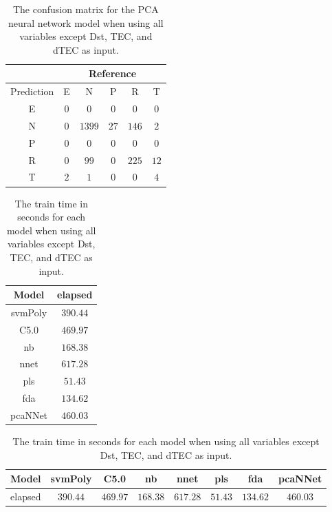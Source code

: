 \begin{table}[!ht]
	\centering
	\begin{tabular}{|c|c|c|c|c|c|}
		\hline
		 & \multicolumn{5}{|c|}{Reference} \\ \hline
		 Prediction & E & N & P & R & T \\ \hline
		 E & $0$ & $0$ & $0$ & $0$ & $0$ \\ \hline
		 N & $0$ & $1399$ & $27$ & $146$ & $2$ \\ \hline
		 P & $0$ & $0$ & $0$ & $0$ & $0$ \\ \hline
		 R & $0$ & $99$ & $0$ & $225$ & $12$ \\ \hline
		 T & $2$ & $1$ & $0$ & $0$ & $4$ \\ \hline
	\end{tabular}
	\caption{The confusion matrix for the PCA neural network model when using all variables except Dst, TEC, and dTEC as input.}
	\label{tab:cm:noTEC:pcaNNet}
\end{table}

\begin{table}[!ht]
	\centering
	\begin{tabular}{|c|c|}
		\hline
		Model & elapsed \\ \hline
		svmPoly & $390.44$ \\ \hline
		C5.0 & $469.97$ \\ \hline
		nb & $168.38$ \\ \hline
		nnet & $617.28$ \\ \hline
		pls & $51.43$ \\ \hline
		fda & $134.62$ \\ \hline
		pcaNNet & $460.03$ \\ \hline
	\end{tabular}
	\caption{The train time in seconds for each model when using all variables except Dst, TEC, and dTEC as input.}
	\label{tab:time:noTEC:train}
\end{table}

\begin{table}[!ht]
	\centering
	\begin{tabular}{|c|c|c|c|c|c|c|c|}
		\hline
		Model & svmPoly & C5.0 & nb & nnet & pls & fda & pcaNNet \\ \hline
		elapsed & $390.44$ & $469.97$ & $168.38$ & $617.28$ & $51.43$ & $134.62$ & $460.03$ \\ \hline
	\end{tabular}
	\caption{The train time in seconds for each model when using all variables except Dst, TEC, and dTEC as input.}
	\label{tab:time:reverse:noTEC:train}
\end{table}

